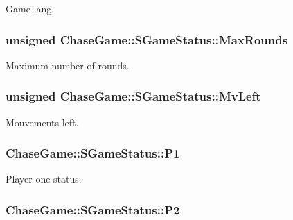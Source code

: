 Game lang. 

\hypertarget{struct_chase_game_1_1_s_game_status_a812deafc733953eaa199eba4ea8216f7}{
\subsubsection[{Max\-Rounds}]{\setlength{\rightskip}{0pt plus 5cm}unsigned Chase\-Game\-::\-S\-Game\-Status\-::\-Max\-Rounds}}\label{struct_chase_game_1_1_s_game_status_a812deafc733953eaa199eba4ea8216f7}


Maximum number of rounds. 

\hypertarget{struct_chase_game_1_1_s_game_status_ae06758bdc7c2bda68801afd314837532}{
\subsubsection[{Mv\-Left}]{\setlength{\rightskip}{0pt plus 5cm}unsigned Chase\-Game\-::\-S\-Game\-Status\-::\-Mv\-Left}}\label{struct_chase_game_1_1_s_game_status_ae06758bdc7c2bda68801afd314837532}


Mouvements left. 

\hypertarget{struct_chase_game_1_1_s_game_status_ae939192c0ce625f9cbec50549ec88fac}{
\subsubsection[{P1}]{ Chase\-Game\-::\-S\-Game\-Status\-::\-P1}}\label{struct_chase_game_1_1_s_game_status_ae939192c0ce625f9cbec50549ec88fac}


Player one status. 

\hypertarget{struct_chase_game_1_1_s_game_status_a21840b6b133cd5a73d5c0cd3b01116e2}{
\subsubsection[{P2}]{ Chase\-Game\-::\-S\-Game\-Status\-::\-P2}}\label{struct_chase_game_1_1_s_game_status_a21840b6b133cd5a73d5c0cd3b01116e2}


